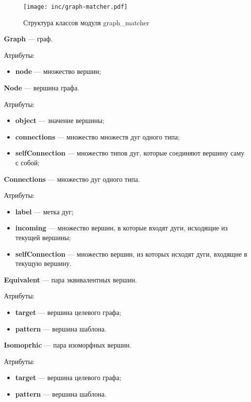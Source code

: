 \begin{figure}[!ht]
\centering
\texttt{[image: inc/graph-matcher.pdf]}
\caption{Структура классов модуля graph\_matcher}
\label{fig:graph-matcher}
\end{figure}

\textbf{Graph} --- граф.

Атрибуты:
\begin{itemize}
\item \textbf{node} --- множество вершин;
\end{itemize}

\textbf{Node} --- вершина графа.

Атрибуты:
\begin{itemize}
\item \textbf{object} --- значение вершины;
\item \textbf{connections} --- множество множеств дуг одного типа;
\item \textbf{selfConnection} --- множество типов дуг, которые соединяют вершину саму с собой;
\end{itemize}

\textbf{Connections} --- множество дуг одного типа.

Атрибуты:
\begin{itemize}
\item \textbf{label} --- метка дуг;
\item \textbf{incoming} --- множество вершин, в которые входят дуги, исходящие из текущей вершины;
\item \textbf{selfConnection} --- множество вершин, из которых исходят дуги, входящие в текущую вершину.
\end{itemize}

\textbf{Equivalent} --- пара эквивалентных вершин.

Атрибуты:
\begin{itemize}
\item \textbf{target} --- вершина целевого графа;
\item \textbf{pattern} --- вершина шаблона.
\end{itemize}

\textbf{Isomoprhic} --- пара изоморфных вершин.

Атрибуты:
\begin{itemize}
\item \textbf{target} --- вершина целевого графа;
\item \textbf{pattern} --- вершина шаблона.
\end{itemize}

